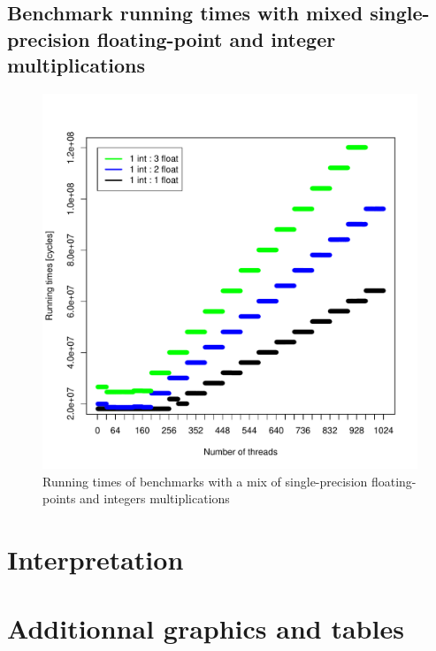 \documentclass{article}
\def \scalingfactor{.8}
\begin{document}
	\subsection{Benchmark running times with mixed single-precision floating-point and integer multiplications}
	\begin{figure}[h]
		\centering
		\vspace{-20pt}
        \includegraphics[width=\scalingfactor\linewidth]{"graphics/running_times_mixed"}
		\vspace{-15pt}
        \caption{Running times of benchmarks with a mix of single-precision floating-points and integers multiplications}
    \end{figure}
	\pagebreak

\section{Interpretation}

\section{Additionnal graphics and tables}
\end{document}
